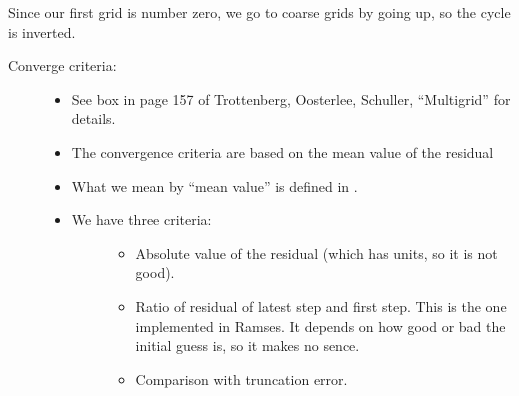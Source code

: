 \documentclass[letterpaper,10pt,english]{sphinxmanual}
\begin{document}
Since our first grid is number zero, we go to coarse grids by going up,
so the cycle is inverted.
\begin{description}
\item[{Converge criteria:}] \leavevmode\begin{itemize}
\item {} 
See box in page 157 of Trottenberg, Oosterlee, Schuller, “Multigrid” for details.

\item {} 
The convergence criteria are based on the mean value of the residual

\item {} 
What we mean by “mean value” is defined in .

\item {} \begin{description}
\item[{We have three criteria:}] \leavevmode\begin{itemize}
\item {} 
Absolute value of the residual (which has units, so it is not good).

\item {} 
Ratio of residual of latest step and first step.  This is the one implemented in Ramses.  It depends on how good or bad the initial guess is, so it makes no sence.

\item {} 
Comparison with truncation error.

\end{itemize}

\end{description}

\end{itemize}

\end{description}

\begin{fulllineitems}
\label{\detokenize{sphinx-c-apidoc/output/gravity/mond_mass/cycles_mm_c:c.cycle_v_mm}}%
\pysigstartmultiline
{}%
\pysigstopmultiline
\end{fulllineitems}
\end{document}
